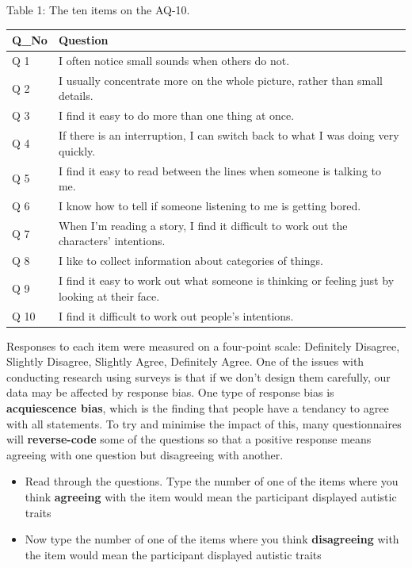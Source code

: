 \documentclass[
  oneside]{book}
\providecommand{\tightlist}{%
  \setlength{\itemsep}{0pt}\setlength{\parskip}{0pt}}
\begin{document}
Table 1: The ten items on the AQ-10.

\begin{tabular}{l|l}
\hline
Q\_No & Question\\
\hline
Q 1 & I often notice small sounds when others do not.\\
\hline
Q 2 & I usually concentrate more on the whole picture, rather than small details.\\
\hline
Q 3 & I find it easy to do more than one thing at once.\\
\hline
Q 4 & If there is an interruption, I can switch back to what I was doing very quickly.\\
\hline
Q 5 & I find it easy to read between the lines when someone is talking to me.\\
\hline
Q 6 & I know how to tell if someone listening to me is getting bored.\\
\hline
Q 7 & When I’m reading a story, I find it difficult to work out the characters’ intentions.\\
\hline
Q 8 & I like to collect information about categories of things.\\
\hline
Q 9 & I find it easy to work out what someone is thinking or feeling just by looking at their face.\\
\hline
Q 10 & I find it difficult to work out people’s intentions.\\
\hline
\end{tabular}

Responses to each item were measured on a four-point scale: Definitely Disagree, Slightly Disagree, Slightly Agree, Definitely Agree. One of the issues with conducting research using surveys is that if we don't design them carefully, our data may be affected by response bias. One type of response bias is \textbf{acquiescence bias}, which is the finding that people have a tendancy to agree with all statements. To try and minimise the impact of this, many questionnaires will \textbf{reverse-code} some of the questions so that a positive response means agreeing with one question but disagreeing with another.

\begin{itemize}
\tightlist
\item
  Read through the questions. Type the number of one of the items where you think \textbf{agreeing} with the item would mean the participant displayed autistic traits
\item
  Now type the number of one of the items where you think \textbf{disagreeing} with the item would mean the participant displayed autistic traits
\end{itemize}
\end{document}
